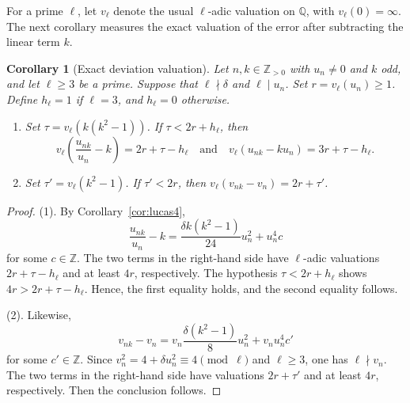 \documentclass[12pt]{amsart}
\numberwithin{equation}{section}
\newtheorem{corollary}[theorem]{Corollary}
\theoremstyle{remark}
\theoremstyle{plain}
\newcommand{\Z}{\mathbb{Z}}
\newcommand{\Q}{\mathbb{Q}}
\begin{document}
For a prime $\ell$, let $v_\ell$ denote the usual $\ell$-adic valuation on $\Q$, with $v_\ell(0)=\infty$. The next corollary measures the exact valuation of the error after subtracting the linear term $k$.
\begin{corollary}[Exact deviation valuation]\label{cor:deviation-vp}
	Let $n,k\in\Z_{>0}$ with $u_n\neq0$ and $k$ odd, and let $\ell\geq3$ be a prime. Suppose that $\ell\nmid\delta$ and $\ell\mid u_n$. Set $r=v_\ell(u_n)\geq1$. Define $h_\ell=1$ if $\ell=3$, and $h_\ell=0$ otherwise.
	\begin{enumerate}[label=\textup{(\arabic*)}]
		\item Set $\tau=v_\ell(k(k^2-1))$. If $\tau<2r+h_\ell$, then
		\[
		v_\ell\left(\frac{u_{nk}}{u_n}-k\right)=2r+\tau-h_\ell\quad\text{and}\quad v_\ell(u_{nk}-ku_n)=3r+\tau-h_\ell.
		\]
		\item Set $\tau'=v_\ell(k^2-1)$. If $\tau'<2r$, then $v_\ell(v_{nk}-v_n)=2r+\tau'$.
	\end{enumerate}
\end{corollary}
\begin{proof}
	\textup{(1)}. By Corollary~\ref{cor:lucas4},
	\[
	\frac{u_{nk}}{u_n}-k=\frac{\delta k(k^2-1)}{24}u_n^2+u_n^4c
	\]
	for some $c\in\Z$. The two terms in the right-hand side have $\ell$-adic valuations $2r+\tau-h_\ell$ and at least $4r$, respectively. The hypothesis $\tau<2r+h_\ell$ shows $4r>2r+\tau-h_\ell$. Hence, the first equality holds, and the second equality follows.
	
	\textup{(2)}. Likewise,
	\[
	v_{nk}-v_n=v_n\frac{\delta(k^2-1)}8u_n^2+v_nu_n^4c'
	\]
	for some $c'\in\Z$. Since $v_n^2=4+\delta u_n^2\equiv4\pmod{\ell}$ and $\ell\geq3$, one has $\ell\nmid v_n$. The two terms in the right-hand side have valuations $2r+\tau'$ and at least $4r$, respectively. Then the conclusion follows.
\end{proof}
\end{document}
